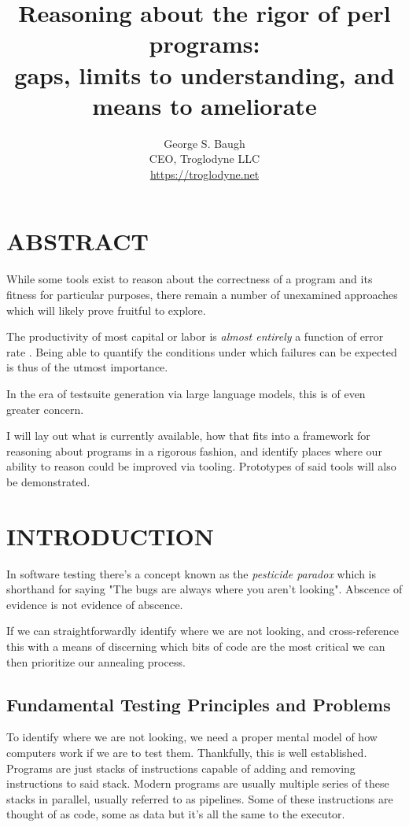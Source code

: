 \documentclass{article}
\title{%
    Reasoning about the rigor of perl programs: \\
    \large gaps, limits to understanding, and means to ameliorate
}
\author{%
    George S. Baugh \\
    \large CEO, Troglodyne LLC \\
    \url{https://troglodyne.net}
}
\begin{document}
\maketitle

\section{ABSTRACT}

While some tools exist to reason about the correctness of a program and its fitness for particular purposes,
there remain a number of unexamined approaches which will likely prove fruitful to explore.

The productivity of most capital or labor is \textit{almost entirely} a function of error rate \cite{oring}.
Being able to quantify the conditions under which failures can be expected is thus of the utmost importance.

In the era of testsuite generation via large language models, this is of even greater concern.

I will lay out what is currently available, how that fits into a framework for reasoning about programs
in a rigorous fashion, and identify places where our ability to reason could be improved via tooling.
Prototypes of said tools will also be demonstrated.

\newpage
\section{INTRODUCTION}

In software testing there's a concept known as the \textit{pesticide paradox} \cite{bezier} which is shorthand for saying
"The bugs are always where you aren't looking".  Abscence of evidence is not evidence of abscence.

If we can straightforwardly identify where we are not looking, and cross-reference this with
a means of discerning which bits of code are the most critical we can then prioritize our annealing process.

\subsection{Fundamental Testing Principles and Problems}

To identify where we are not looking, we need a proper mental model of how computers work if we are to test them.
Thankfully, this is well established.
Programs are just stacks of instructions capable of adding and removing instructions to said stack.
Modern programs are usually multiple series of these stacks in parallel, usually referred to as pipelines.
Some of these instructions are thought of as code, some as data but it's all the same to the executor.
\end{document}
